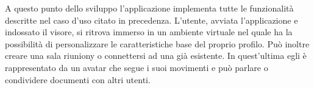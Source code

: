 A questo punto dello sviluppo l'applicazione implementa tutte le funzionalità descritte nel caso d'uso citato in precedenza. L'utente, avviata l'applicazione e indossato il visore, si ritrova immerso in un ambiente virtuale nel quale ha la possibilità di personalizzare le caratteristiche base del proprio profilo. Può inoltre creare una sala riuniony o connettersi ad una già esistente. In quest'ultima egli è rappresentato da un avatar che segue i suoi movimenti e può parlare o condividere documenti con altri utenti.









